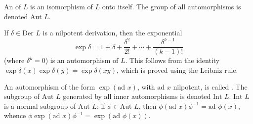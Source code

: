 An  of $L$ is an isomorphism of $L$ onto itself. The group of all automorphisms is denoted $\text{Aut } L$.

If $\delta \in \text{Der } L$ is a nilpotent derivation, then the exponential
$$\exp \delta = 1 + \delta + \frac{\delta^2}{2!} + \cdots + \frac{\delta^{k-1}}{(k-1)!}$$
(where $\delta^k = 0$) is an automorphism of $L$. This follows from the identity $\exp \delta(x) \exp \delta(y) = \exp \delta(xy)$, which is proved using the Leibniz rule.

An automorphism of the form $\exp(\text{ad } x)$, with $\text{ad } x$ nilpotent, is called . The subgroup of $\text{Aut } L$ generated by all inner automorphisms is denoted $\text{Int } L$. $\text{Int } L$ is a normal subgroup of $\text{Aut } L$: if $\phi \in \text{Aut } L$, then $\phi(\text{ad } x)\phi^{-1} = \text{ad } \phi(x)$, whence $\phi \exp(\text{ad } x)\phi^{-1} = \exp(\text{ad } \phi(x))$.
